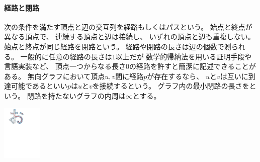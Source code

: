 \begin{paracol}{2}
\paragraph{経路と閉路}
次の条件を満たす頂点と辺の交互列を経路もしくはパスという。
始点と終点が異なる頂点で、
連続する頂点と辺は接続し、
いずれの頂点と辺も重複しない。
始点と終点が同じ経路を閉路という。
経路や閉路の長さは辺の個数で測られる。
一般的に任意の経路の長さは$1$以上だが
数学的帰納法を用いる証明手段や言語実装など、
頂点一つからなる長さ$0$の経路を許すと簡潔に記述できることがある。
無向グラフにおいて頂点$u, v$間に経路$p$が存在するなら、
$u$と$v$は互いに到達可能であるといい$p$は$u$と$v$を接続するという。
グラフ内の最小閉路の長さをという。
閉路を持たないグラフの内周は$\infty$とする。


\switchcolumn
\vspace{1.5\intextsep}
\centering
\includegraphics[width=0.14\textwidth]{figures/paths.pdf}
\end{paracol}





